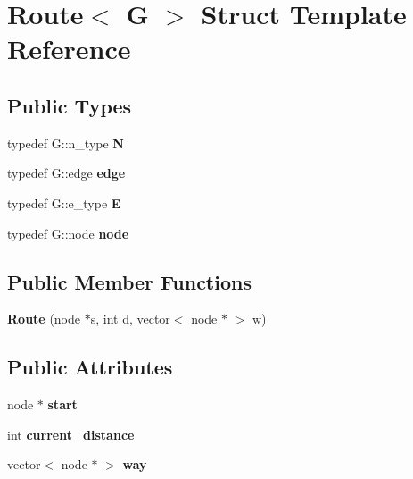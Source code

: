 \hypertarget{structRoute}{\section{\-Route$<$ \-G $>$ \-Struct \-Template \-Reference}
\label{structRoute}
}
\subsection*{\-Public \-Types}
\begin{DoxyCompactItemize}
\item 
\hypertarget{structRoute_ab15ef1e533dae48179c88ff9b920524c}{typedef \-G\-::n\-\_\-type {\bfseries \-N}}\label{structRoute_ab15ef1e533dae48179c88ff9b920524c}

\item 
\hypertarget{structRoute_ada4e3bfc6ea39b224523efdf57106149}{typedef \-G\-::edge {\bfseries edge}}\label{structRoute_ada4e3bfc6ea39b224523efdf57106149}

\item 
\hypertarget{structRoute_a7e88859ce4dd01fa7a89290a61baec67}{typedef \-G\-::e\-\_\-type {\bfseries \-E}}\label{structRoute_a7e88859ce4dd01fa7a89290a61baec67}

\item 
\hypertarget{structRoute_a9bb923e50607bc0d6fd54cf99c972fa9}{typedef \-G\-::node {\bfseries node}}\label{structRoute_a9bb923e50607bc0d6fd54cf99c972fa9}

\end{DoxyCompactItemize}
\subsection*{\-Public \-Member \-Functions}
\begin{DoxyCompactItemize}
\item 
\hypertarget{structRoute_a49208eb6741e046c904a397aace5990d}{{\bfseries \-Route} (node $\ast$s, int d, vector$<$ node $\ast$ $>$ w)}\label{structRoute_a49208eb6741e046c904a397aace5990d}

\end{DoxyCompactItemize}
\subsection*{\-Public \-Attributes}
\begin{DoxyCompactItemize}
\item 
\hypertarget{structRoute_a223eec263a5b7db300f6163423be4a03}{node $\ast$ {\bfseries start}}\label{structRoute_a223eec263a5b7db300f6163423be4a03}

\item 
\hypertarget{structRoute_adc67ae6931b1515b4aea4851deaaff99}{int {\bfseries current\-\_\-distance}}\label{structRoute_adc67ae6931b1515b4aea4851deaaff99}

\item 
\hypertarget{structRoute_a71ee722b2729beaebdd349beab60c791}{vector$<$ node $\ast$ $>$ {\bfseries way}}\label{structRoute_a71ee722b2729beaebdd349beab60c791}

\end{DoxyCompactItemize}
